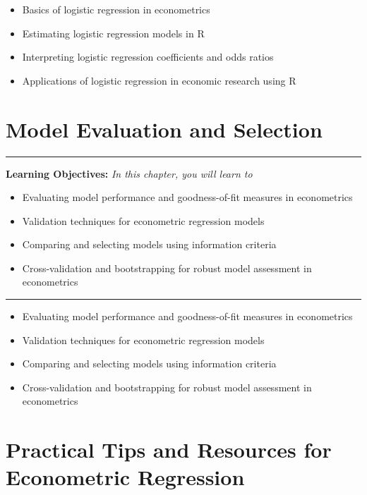 \documentclass[
  letterpaper,
  twoside,
  openany]{scrbook}
\providecommand{\abstractname}{Learning Objectives} %
\newenvironment{objectives}[1]{%
	\hrule
	\vspace{5pt}
	\small\textbf{\abstractname: } 
	\newline
	\vspace{0.1cm}
	\small\emph{#1} %
	\itshape %
}{%
	\vspace{5pt}
	\hrule
	\vspace{0.6cm}
}
\begin{document}
\begin{itemize}
\item
  Basics of logistic regression in econometrics
\item
  Estimating logistic regression models in R
\item
  Interpreting logistic regression coefficients and odds ratios
\item
  Applications of logistic regression in economic research using R
\end{itemize}

\hypertarget{model-evaluation-and-selection}{%
\chapter{Model Evaluation and
Selection}\label{model-evaluation-and-selection}}

\begin{objectives}{In this chapter, you will learn to}
\begin{itemize}

\item{Evaluating model performance and goodness-of-fit measures in econometrics}

\item{Validation techniques for econometric regression models}

\item{Comparing and selecting models using information criteria}

\item{Cross-validation and bootstrapping for robust model assessment in econometrics}

\end{itemize}

\end{objectives}

\begin{itemize}
\item
  Evaluating model performance and goodness-of-fit measures in
  econometrics
\item
  Validation techniques for econometric regression models
\item
  Comparing and selecting models using information criteria
\item
  Cross-validation and bootstrapping for robust model assessment in
  econometrics
\end{itemize}

\hypertarget{practical-tips-and-resources-for-econometric-regression}{%
\chapter{Practical Tips and Resources for Econometric
Regression}\label{practical-tips-and-resources-for-econometric-regression}}
\end{document}
